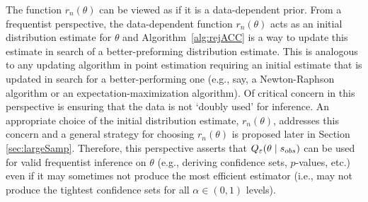 The function $r_{n}(\theta)$ can be viewed as if it is a data-dependent prior. From a frequentist perspective, the data-dependent function $r_{n}(\theta)$ acts as an initial distribution estimate for $\theta$ and Algorithm~\ref{alg:rejACC} is a way to update this estimate in search of a better-preforming distribution estimate. This is analogous to any updating algorithm in point estimation requiring an initial estimate that is updated in search for a better-performing one (e.g., say, a Newton-Raphson algorithm or an expectation-maximization algorithm). Of critical concern in this perspective is ensuring that the data is not `doubly used' for inference. %
An appropriate choice of the initial distribution estimate, $r_{n}(\theta)$, addresses this concern and a general strategy for choosing $r_n(\theta)$ is proposed later in  
Section \ref{sec:largeSamp}. %
Therefore, this perspective asserts that $Q_{\varepsilon}(\theta\mid s_{\relax obs})$ can be used for valid frequentist inference on $\theta$ (e.g., deriving confidence sets, $p$-values, etc.) %
even if it may sometimes not produce the most efficient estimator (i.e., may not produce the tightest confidence sets for all $\alpha\in (0,1)$ levels). %
	

